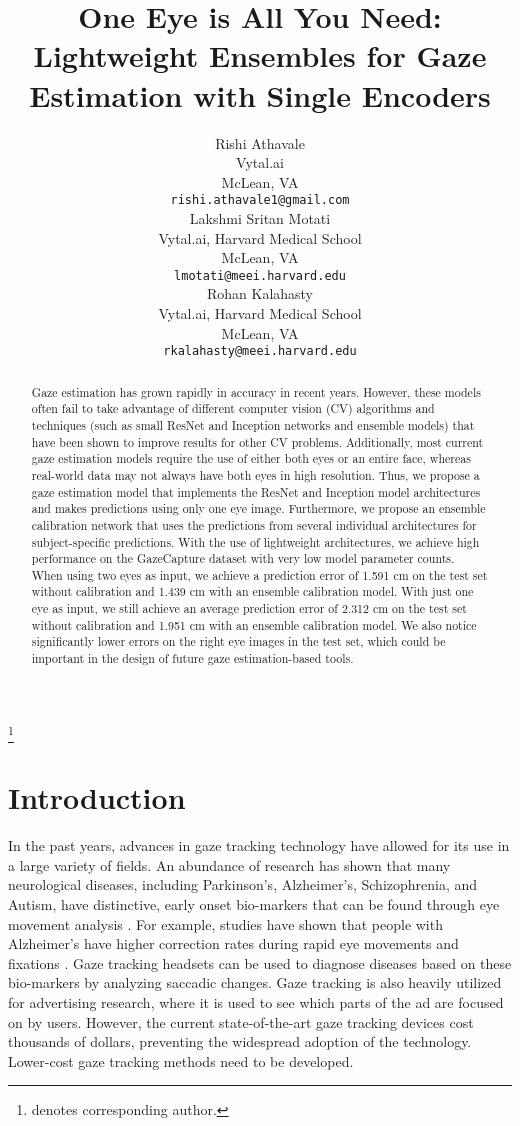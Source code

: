 \documentclass{article}
\title{One Eye is All You Need: Lightweight Ensembles for Gaze Estimation with Single Encoders}
\author{Rishi Athavale \\
  Vytal.ai \\
  McLean, VA \\
  \texttt{rishi.athavale1@gmail.com} \\
  \And
  Lakshmi Sritan Motati \\
  Vytal.ai, Harvard Medical School\\
  McLean, VA \\
  \texttt{lmotati@meei.harvard.edu} \\
  \And
  Rohan Kalahasty \Envelope \hspace{1pt} \\ 
  Vytal.ai, Harvard Medical School \\
  McLean, VA \\
  \texttt{rkalahasty@meei.harvard.edu} \\
}
\newcommand\blfootnote[1]{\begingroup
  \renewcommand\thefootnote{}\footnote{#1}\addtocounter{footnote}{-1}\endgroup
}
\begin{document}
\maketitle
\blfootnote{ denotes corresponding author.}

\begin{abstract}
    Gaze estimation has grown rapidly in accuracy in recent years. However, these models often fail to take advantage of different computer vision (CV) algorithms and techniques (such as small ResNet and Inception networks and ensemble models) that have been shown to improve results for other CV problems. Additionally, most current gaze estimation models require the use of either both eyes or an entire face, whereas real-world data may not always have both eyes in high resolution. Thus, we propose a gaze estimation model that implements the ResNet and Inception model architectures and makes predictions using only one eye image. Furthermore, we propose an ensemble calibration network that uses the predictions from several individual architectures for subject-specific predictions. With the use of lightweight architectures, we achieve high performance on the GazeCapture dataset with very low model parameter counts. When using two eyes as input, we achieve a prediction error of 1.591 cm on the test set without calibration and 1.439 cm with an ensemble calibration model. With just one eye as input, we still achieve an average prediction error of 2.312 cm on the test set without calibration and 1.951 cm with an ensemble calibration model. We also notice significantly lower errors on the right eye images in the test set, which could be important in the design of future gaze estimation-based tools.
\end{abstract}

\section{Introduction}
In the past years, advances in gaze tracking technology have allowed for its use in a large variety of fields. An abundance of research has shown that many neurological diseases, including Parkinson's, Alzheimer's, Schizophrenia, and Autism, have distinctive, early onset bio-markers that can be found through eye movement analysis \cite{mao_he_liu_chen_2020}. For example, studies have shown that people with Alzheimer's have higher correction rates during rapid eye movements and fixations \cite{opwonya_doan_kim_kim_ku_kim_park_kim_2021}. Gaze tracking headsets can be used to diagnose diseases based on these bio-markers by analyzing saccadic changes. Gaze tracking is also heavily utilized for advertising research, where it is used to see which parts of the ad are focused on by users. However, the current state-of-the-art gaze tracking devices cost thousands of dollars, preventing the widespread adoption of the technology. Lower-cost gaze tracking methods need to be developed.
\end{document}
